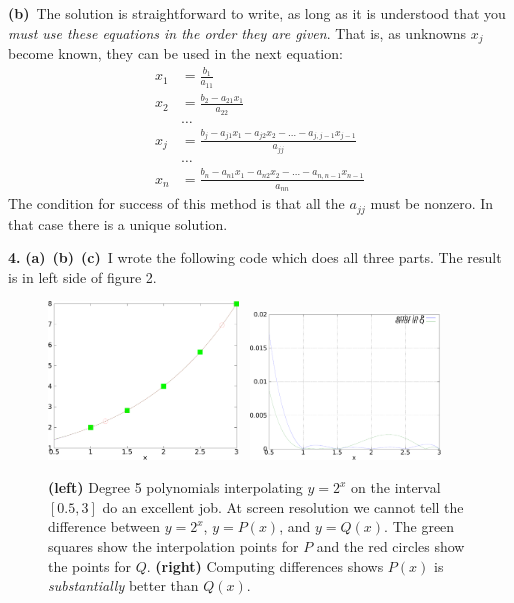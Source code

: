 \documentclass[11pt]{amsart}
\newcommand{\mfile}[1]{
\begin{quote}
\bigskip
\VerbatimInput[frame=single,label=\fbox{\normalsize \textsl{\,#1\,}},fontfamily=courier,fontsize=\scriptsize]{#1}
\end{quote}
}
\newcommand{\ppart}[1]{\textbf{(#1)}\, }
\newcommand{\epart}[1]{\medskip\noindent\quad\textbf{(#1)}\, }
\newcommand{\prob}[1]{\medskip\noindent\textbf{#1.}\quad }
\begin{document}
\epart{b}  The solution is straightforward to write, as long as it is understood that you \emph{must use these equations in the order they are given}.  That is, as unknowns $x_j$ become known, they can be used in the next equation:
\begin{align*}
x_1 &= \frac{b_1}{a_{11}} \\
x_2 &= \frac{b_2 - a_{21} x_1}{a_{22}} \\
& \dots \\
x_j &= \frac{b_j - a_{j1} x_1 - a_{j2} x_2 - \dots - a_{j,j-1} x_{j-1}}{a_{jj}} \\
 & \dots \\
x_n &= \frac{b_n - a_{n1} x_1 - a_{n2} x_2 - \dots - a_{n,n-1} x_{n-1}}{a_{nn}}
\end{align*}
\noindent The condition for success of this method is that all the $a_{jj}$ must be nonzero.  In that case there is a unique solution.


\prob{4}  \ppart{a} \ppart{b} \ppart{c} I wrote the following code which does all three parts.  The result is in left side of figure 2.

\mfile{smoothpolyapprox.m}

\begin{figure}[ht]
\includegraphics[width=0.45\textwidth]{smoothpolyapprox} \, \includegraphics[width=0.45\textwidth]{clearpolyerror}
\caption{\textbf{(left)}  Degree 5 polynomials interpolating $y=2^x$ on the interval $[0.5,3]$ do an excellent job.  At screen resolution we cannot tell the difference between $y=2^x$, $y=P(x)$, and $y=Q(x)$.  The green squares show the interpolation points for $P$ and the red circles show the points for $Q$.  \textbf{(right)} Computing differences shows $P(x)$ is \emph{substantially} better than $Q(x)$.}
\end{figure}
\end{document}
